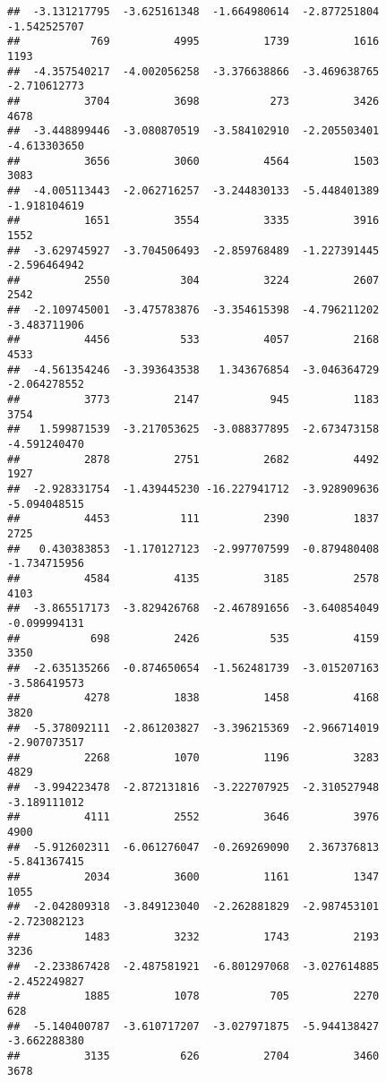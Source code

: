 \documentclass[
]{article}
\begin{document}
\begin{verbatim}
##  -3.131217795  -3.625161348  -1.664980614  -2.877251804  -1.542525707 
##           769          4995          1739          1616          1193 
##  -4.357540217  -4.002056258  -3.376638866  -3.469638765  -2.710612773 
##          3704          3698           273          3426          4678 
##  -3.448899446  -3.080870519  -3.584102910  -2.205503401  -4.613303650 
##          3656          3060          4564          1503          3083 
##  -4.005113443  -2.062716257  -3.244830133  -5.448401389  -1.918104619 
##          1651          3554          3335          3916          1552 
##  -3.629745927  -3.704506493  -2.859768489  -1.227391445  -2.596464942 
##          2550           304          3224          2607          2542 
##  -2.109745001  -3.475783876  -3.354615398  -4.796211202  -3.483711906 
##          4456           533          4057          2168          4533 
##  -4.561354246  -3.393643538   1.343676854  -3.046364729  -2.064278552 
##          3773          2147           945          1183          3754 
##   1.599871539  -3.217053625  -3.088377895  -2.673473158  -4.591240470 
##          2878          2751          2682          4492          1927 
##  -2.928331754  -1.439445230 -16.227941712  -3.928909636  -5.094048515 
##          4453           111          2390          1837          2725 
##   0.430383853  -1.170127123  -2.997707599  -0.879480408  -1.734715956 
##          4584          4135          3185          2578          4103 
##  -3.865517173  -3.829426768  -2.467891656  -3.640854049  -0.099994131 
##           698          2426           535          4159          3350 
##  -2.635135266  -0.874650654  -1.562481739  -3.015207163  -3.586419573 
##          4278          1838          1458          4168          3820 
##  -5.378092111  -2.861203827  -3.396215369  -2.966714019  -2.907073517 
##          2268          1070          1196          3283          4829 
##  -3.994223478  -2.872131816  -3.222707925  -2.310527948  -3.189111012 
##          4111          2552          3646          3976          4900 
##  -5.912602311  -6.061276047  -0.269269090   2.367376813  -5.841367415 
##          2034          3600          1161          1347          1055 
##  -2.042809318  -3.849123040  -2.262881829  -2.987453101  -2.723082123 
##          1483          3232          1743          2193          3236 
##  -2.233867428  -2.487581921  -6.801297068  -3.027614885  -2.452249827 
##          1885          1078           705          2270           628 
##  -5.140400787  -3.610717207  -3.027971875  -5.944138427  -3.662288380 
##          3135           626          2704          3460          3678 

\end{verbatim}
\end{document}
